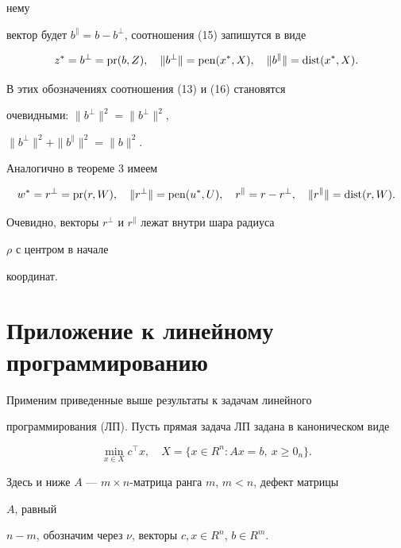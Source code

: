 нему


вектор будет $b^\parallel=b-b^\bot$, соотношения (15) запишутся в виде


$$


z^*=b^\bot=\pr(b,Z),\quad \|b^\bot\|=\pen(x^*,X),\quad


\|b^\parallel\|=\dist(x^*,X).


$$





В этих обозначениях соотношения (13) и (16) становятся


очевидными: $\|b^\bot\|^2=\|b^\bot\|^2$, 


$\|b^\bot\|^2+\|b^\parallel\|^2=\|b\|^2$.


Аналогично в теореме 3 имеем


$$


w^*=r^\bot=\pr(r,W),\quad \|r^\bot\|=\pen(u^*,U),\quad


r^\parallel=r-r^\bot,\quad


\|r^\parallel\|=\dist(r,W).


$$


Очевидно, векторы $r^\bot$ и $r^\parallel$ лежат внутри шара радиуса 


$\rho$ с центром в начале


координат.





\section{Приложение к линейному программированию}





Применим приведенные выше результаты к задачам линейного


программирования (ЛП). Пусть прямая задача ЛП задана в каноническом виде


\begin{equation}


\min_{x\in X}c^\top x,\quad X=\{x\in R^n:Ax=b,\ x\ge0_n\}.\tag{$\p$}


\end{equation}


Здесь и ниже $A$ --- $m\times n$-матрица ранга $m$, $m<n$, дефект матрицы 


$A$, равный


$n-m$, обозначим через $\nu$, векторы $c,x\in R^n$, $b\in R^m$.





